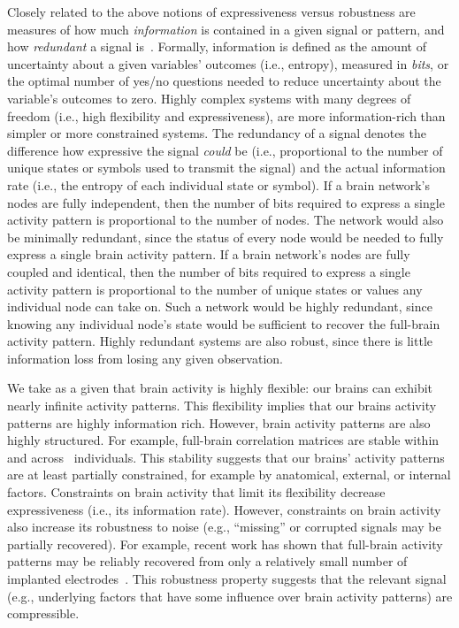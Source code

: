 \documentclass[english]{article}
\begin{document}

Closely related to the above notions of expressiveness versus robustness are
measures of how much \textit{information} is contained in a given signal or
pattern, and how \textit{redundant} a signal is~\citep{Shan48}. Formally,
information is defined as the amount of uncertainty about a given variables'
outcomes (i.e., entropy), measured in \textit{bits}, or the optimal number of
yes/no questions needed to reduce uncertainty about the variable's outcomes to
zero. Highly complex systems with many degrees of freedom (i.e., high
flexibility and expressiveness), are more information-rich than simpler or more
constrained systems. The redundancy of a signal denotes the difference how
expressive the signal \textit{could} be (i.e., proportional to the number of
unique states or symbols used to transmit the signal) and the actual
information rate (i.e., the entropy of each individual state or symbol). If a
brain network's nodes are fully independent, then the number of bits required
to express a single activity pattern is proportional to the number of nodes.
The network would also be minimally redundant, since the status of every node
would be needed to fully express a single brain activity pattern. If a brain
network's nodes are fully coupled and identical, then the number of bits
required to express a single activity pattern is proportional to the number of
unique states or values any individual node can take on. Such a network would
be highly redundant, since knowing any individual node's state would be
sufficient to recover the full-brain activity pattern. Highly redundant systems
are also robust, since there is little information loss from losing any given
observation.

We take as a given that brain activity is highly flexible: our brains can
exhibit nearly infinite activity patterns. This flexibility implies that our
brains activity patterns are highly information rich. However, brain activity
patterns are also highly structured. For example, full-brain correlation
matrices are stable within~\citep{FinnEtal15, FinnEtal17, GratEtal18} and
across~\citep{YeoEtal11, GlerEtal12, GratEtal18, ColeEtal14} individuals. This
stability suggests that our brains' activity patterns are at least partially
constrained, for example by anatomical, external, or internal factors.
Constraints on brain activity that limit its flexibility decrease
expressiveness (i.e., its information rate). However, constraints on brain
activity also increase its robustness to noise (e.g., ``missing'' or corrupted
signals may be partially recovered). For example, recent work has shown that
full-brain activity patterns may be reliably recovered from only a relatively
small number of implanted electrodes~\citep{OwenEtal20, ScanEtal21}. This
robustness property suggests that the relevant signal (e.g., underlying factors
that have some influence over brain activity patterns) are compressible.
\end{document}
